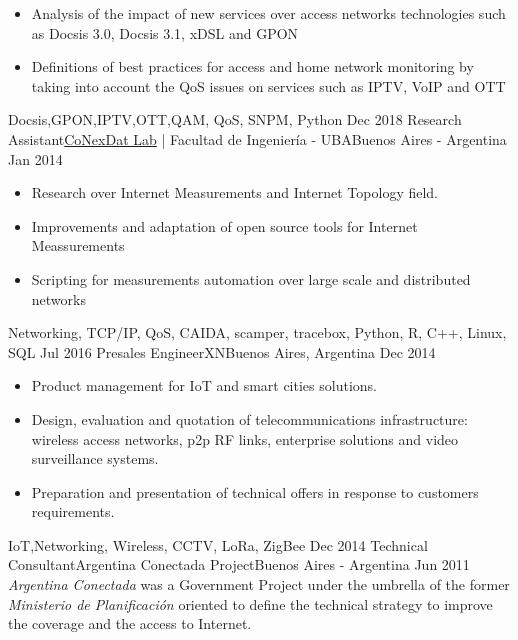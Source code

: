\begin{experiences}
{                      \begin{itemize}
                      \item Analysis of the impact of new services over access networks technologies such as Docsis 3.0, Docsis 3.1, xDSL and GPON
                      \item Definitions of best practices for access  and home network monitoring by taking into account the QoS issues on services such as IPTV, VoIP and OTT
                      \end{itemize}
                    }
                    {Docsis,GPON,IPTV,OTT,QAM, QoS, SNPM, Python}
  \emptySeparator
  \experience
    {Dec 2018}     {Research Assistant}{\href{https://cnet.fi.uba.ar/en/}{\color{accentcolor}CoNexDat Lab} | Facultad de Ingeniería - UBA}{Buenos Aires - Argentina}
    {Jan 2014}    {
                      \begin{itemize}
                        \item Research over Internet Measurements and Internet Topology field.
                        \item Improvements and adaptation of open source tools for Internet Meassurements
                        \item Scripting for  measurements automation over large scale and distributed networks
                      \end{itemize}
                    }
                    {Networking, TCP/IP, QoS, CAIDA, scamper, tracebox, Python, R, C++, Linux, SQL}
  \emptySeparator
  \experience
  {Jul 2016}       {Presales Engineer}{XN}{Buenos Aires, Argentina}
  {Dec 2014}   {
                      \begin{itemize}
                      \item Product management for IoT  and smart cities solutions.
                      \item Design, evaluation and quotation of telecommunications infrastructure: wireless access networks, p2p RF links, enterprise solutions and video surveillance systems.
                      \item Preparation and presentation of technical offers in response to customers requirements.
                      \end{itemize}
                    }
                    {IoT,Networking, Wireless, CCTV, LoRa, ZigBee}
  \emptySeparator         
  \experience
  {Dec 2014}  {Technical Consultant}{Argentina Conectada Project}{Buenos Aires - Argentina}
  {Jun 2011}   {
                      \emph{Argentina Conectada} was a Government Project under the umbrella of the former \emph{Ministerio de Planificación} oriented to define the technical strategy to improve the coverage and the access to Internet.
}
\end{experiences}
